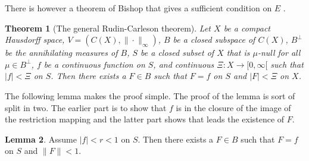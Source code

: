 \documentclass[a4paper,12pt,twoside,BCOR=10mm]{scrbook}
\newtheorem{theorem}{Theorem}[section]
\theoremstyle{definition}
\theoremstyle{definition}
\newtheorem{lemma}[theorem]{Lemma}
\theoremstyle{definition}
\begin{document}
There is however a theorem of Bishop that gives a sufficient condition on $E$ \citep{bishop}.
\begin{theorem}[The general Rudin-Carleson theorem]
\label{bishopstheorem}
Let $X$ be a compact Hausdorff space,
	$V = (C(X), \| \cdot \|_{\infty})$,
	$B$ be a closed subspace of $C(X)$,
	$B^{\bot}$ be the annihilating measures of $B$,
	$S$ be a closed subset of $X$ that is $\mu$-null for all $\mu \in B^{\bot}$, %
	$f$ be a continuous function on $S$,
	and continuous $\Xi: X \rightarrow [0, \infty[$ such that $|f| < \Xi$ on $S$.
Then there exists a $F \in B$ such that $F = f$ on $S$ and $|F| < \Xi$ on $X$.
\end{theorem}
The following lemma makes the proof simple.
The proof of the lemma is sort of split in two.
The earlier part is to show that $f$ is in the closure of the image of the restriction mapping and the latter part shows that leads the existence of $F$.
\begin{lemma}
\label{bishoplemma}
Assume $|f| < r < 1$ on $S$.
Then there exists a $F \in B$ such that $F = f$ on $S$ and $\|F\| < 1$.
\end{lemma}
\end{document}
